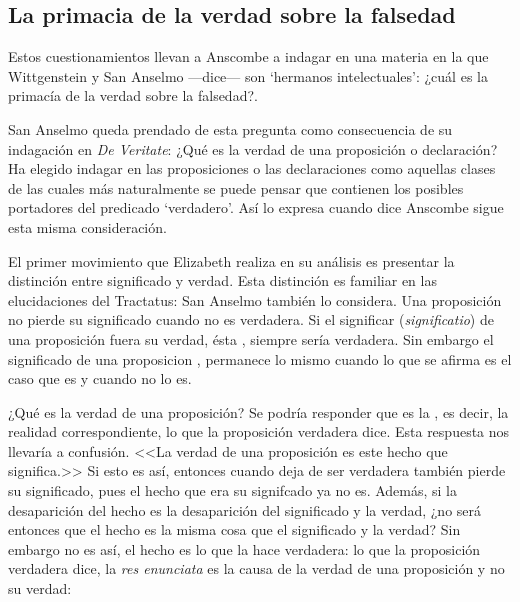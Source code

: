 \subsection{La primacia de la verdad sobre la falsedad}
Estos cuestionamientos llevan a Anscombe a indagar en una materia en la que
Wittgenstein y San Anselmo ---dice--- son `hermanos intelectuales': ¿cuál es la
primacía de la verdad sobre la falsedad?.

San Anselmo queda prendado de esta pregunta como consecuencia de su indagación
en \emph{De Veritate}: ¿Qué es la verdad de una proposición o declaración? Ha
elegido indagar en las proposiciones o las declaraciones como aquellas clases de
las cuales más naturalmente se puede pensar que contienen los posibles
portadores del predicado `verdadero'. Así lo expresa cuando dice
\autocite{De Veritate c.
  2} Anscombe sigue esta misma consideración.

El primer movimiento que Elizabeth realiza en su análisis es presentar la
distinción entre significado y verdad. Esta distinción es familiar en las
elucidaciones del Tractatus: 
\autocite[\S~4.061]{wittgenstein1922tractatus} San Anselmo también lo considera.
Una proposición no pierde su significado cuando no es verdadera. Si el
significar (\emph{significatio}) de una proposición fuera su verdad, ésta
, siempre sería verdadera. Sin embargo el
significado de una proposicion , permanece lo mismo cuando lo que se afirma es el
caso que es y cuando no lo es.

¿Qué es la verdad de una proposición? Se podría responder que es la
, es decir, la realidad correspondiente, lo que
la proposición verdadera dice. Esta respuesta nos llevaría a confusión. <<La
verdad de una proposición es este hecho que significa.>> Si esto es así,
entonces cuando deja de ser verdadera también pierde su significado, pues el
hecho que era su signifcado ya no es. Además, si la desaparición del hecho es la
desaparición del significado y la verdad, ¿no será entonces que el hecho es la
misma cosa que el significado y la verdad? Sin embargo no es así, el hecho es lo
que la hace verdadera: lo que la proposición verdadera dice, la \emph{res
  enunciata} es la causa de la verdad de una proposición y no su verdad:

